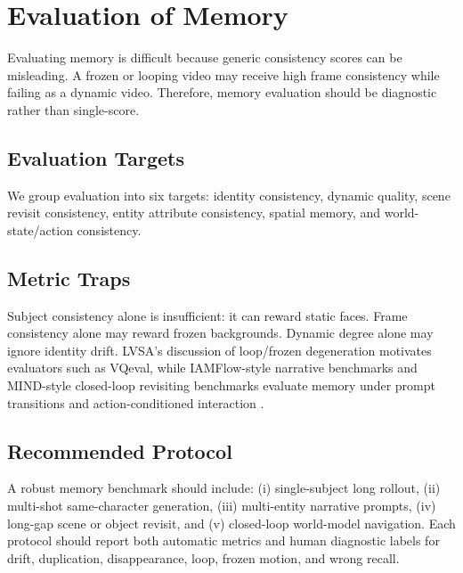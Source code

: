 \section{Evaluation of Memory}

Evaluating memory is difficult because generic consistency scores can be misleading. A frozen or looping video may receive high frame consistency while failing as a dynamic video. Therefore, memory evaluation should be diagnostic rather than single-score.

\subsection{Evaluation Targets}
We group evaluation into six targets: identity consistency, dynamic quality, scene revisit consistency, entity attribute consistency, spatial memory, and world-state/action consistency.

\subsection{Metric Traps}
Subject consistency alone is insufficient: it can reward static faces. Frame consistency alone may reward frozen backgrounds. Dynamic degree alone may ignore identity drift. LVSA's discussion of loop/frozen degeneration motivates evaluators such as VQeval, while IAMFlow-style narrative benchmarks and MIND-style closed-loop revisiting benchmarks evaluate memory under prompt transitions and action-conditioned interaction \citep{lvsa2026,iamflow2026,mind2026}.

\subsection{Recommended Protocol}
A robust memory benchmark should include: (i) single-subject long rollout, (ii) multi-shot same-character generation, (iii) multi-entity narrative prompts, (iv) long-gap scene or object revisit, and (v) closed-loop world-model navigation. Each protocol should report both automatic metrics and human diagnostic labels for drift, duplication, disappearance, loop, frozen motion, and wrong recall.

